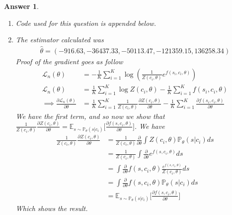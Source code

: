 \documentclass[12pt]{article}
\theoremstyle{colon}
\newtheorem*{answer}{Answer}
\begin{document}
\begin{answer}
  \leavevmode
  \begin{enumerate}[label=\arabic*)]
    \item Code used for this question is appended below.

    \item The estimator calculated was
      \begin{gather*}
        \hat{\theta} = (-916.63, -36437.33, -50113.47, -121359.15, 136258.34)
      \end{gather*}
      Proof of the gradient goes as follow
      \begin{align*}
        \mathcal{L}_n (\theta) &= -\frac{1}{K} \sum_{i=1}^K \log \left(\frac{1}{Z(c_i,\theta)} e^{f(s_i,c_i,\theta)} \right) \\
        \mathcal{L}_n (\theta) &=  \frac{1}{K} \sum_{i=1}^K \log Z(c_i,\theta) - \frac{1}{K} \sum_{i=1}^K f(s_i,c_i,\theta) \\
        \implies \frac{\partial \mathcal{L}_n (\theta)}{\partial \theta} &= \frac{1}{K} \sum_{i=1}^K \frac{1}{Z(c_i,\theta)} \frac{ \partial Z(c_i,\theta)}{\partial \theta} - \frac{1}{K} \sum_{i=1}^K \frac{\partial f(s_i,c_i,\theta)}{\partial \theta}
      \end{align*}
      We have the first term, and so now we show that $\frac{1}{Z(c_i,\theta)} \frac{ \partial Z(c_i,\theta)}{\partial \theta} = \mathbb{E}_{s \sim \mathbb{P}_\theta(s | c_i)} \big[ \frac{\partial f(s, c_i, \theta)}{\partial \theta} \big]$. We have
      \begin{align*}
        \frac{1}{Z(c_i,\theta)} \frac{ \partial Z(c_i,\theta)}{\partial \theta} &= \frac{1}{Z(c_i,\theta)} \frac{\partial}{\partial \theta} \int Z(c_i, \theta) \mathbb{P}_{\theta}(s | c_i) ds \\
        &= \frac{1}{Z(c_i,\theta)} \int \frac{\partial}{\partial \theta} e^{f(s, c_i, \theta)}ds \\
        &= \int \frac{\partial}{\partial \theta} f(s, c_i, \theta) \frac{e^{f(s, c_i, \theta)}}{Z(c_i,\theta)} ds \\
        &= \int \frac{\partial}{\partial \theta} f(s, c_i, \theta) \mathbb{P}_{\theta}(s | c_i)ds \\
        &= \mathbb{E}_{s \sim \mathbb{P}_\theta(s | c_i)} \big[ \frac{\partial f(s, c_i, \theta)}{\partial \theta} \big]
      \end{align*}
      Which shows the result.


\end{enumerate}
\end{answer}
\end{document}
